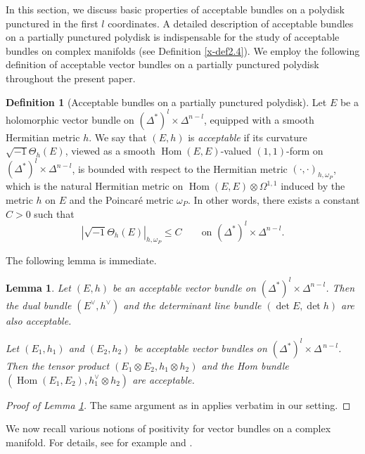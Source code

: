 \documentclass[12pt,twoside]{amsart}
\DeclareMathOperator{\Hom}{Hom}
\newtheorem{lem}[thm]{Lemma}
\theoremstyle{definition}
\newtheorem{defn}[thm]{Definition}
\begin{document}
In this section, we discuss basic properties of acceptable bundles on a
polydisk punctured in the first $l$ coordinates. 
A detailed description of acceptable bundles on a partially punctured polydisk is indispensable for the study of acceptable bundles on complex manifolds (see Definition \ref{x-def2.4}). 
We employ the following definition of acceptable vector bundles on a
partially punctured polydisk throughout the present paper.

\begin{defn}[Acceptable bundles on a partially punctured polydisk]
\label{x-def6.1}
Let $E$ be a holomorphic vector bundle on
$(\Delta^*)^l \times \Delta^{n-l}$, equipped with a smooth Hermitian
metric $h$.
We say that $(E,h)$ is \emph{acceptable} if its curvature
$\sqrt{-1}\Theta_h(E)$, viewed as a smooth
$\Hom(E,E)$-valued $(1,1)$-form on
$(\Delta^*)^l \times \Delta^{n-l}$, is bounded with respect to the
Hermitian metric $(\cdot,\cdot)_{h,\omega_P}$, 
which is the natural Hermitian metric on
$\Hom(E,E)\otimes \Omega^{1,1}$ induced by the metric $h$ on $E$
and the Poincar\'e metric $\omega_P$.
In other words, there exists a constant $C>0$ such that
\[
|\sqrt{-1}\Theta_h(E)|_{h,\omega_P} \leq C
\qquad
\text{on } (\Delta^*)^l \times \Delta^{n-l}.
\]
\end{defn}

The following lemma is immediate.

\begin{lem}\label{x-lem6.2}
Let $(E,h)$ be an acceptable vector bundle on
$(\Delta^*)^l \times \Delta^{n-l}$.
Then the dual bundle $(E^\vee,h^\vee)$ and the determinant line bundle
$(\det E, \det h)$ are also acceptable.

Let $(E_1,h_1)$ and $(E_2,h_2)$ be acceptable vector bundles on
$(\Delta^*)^l \times \Delta^{\,n-l}$.
Then the tensor product $(E_1 \otimes E_2, h_1 \otimes h_2)$ and the Hom bundle
$(\Hom(E_1,E_2), h_1^\vee \otimes h_2)$ are acceptable.
\end{lem}

\begin{proof}[Proof of Lemma \ref{x-lem6.2}]
The same argument as in \cite[Lemma~2.2]{fujino-fujisawa-ono} applies
verbatim in our setting.
\end{proof}

We now recall various notions of positivity for vector bundles on a complex
manifold.
For details, see for example \cite[Chapter~10]{demailly1} and 
\cite[Chapter~VII, \S6]{demailly}.
\end{document}
